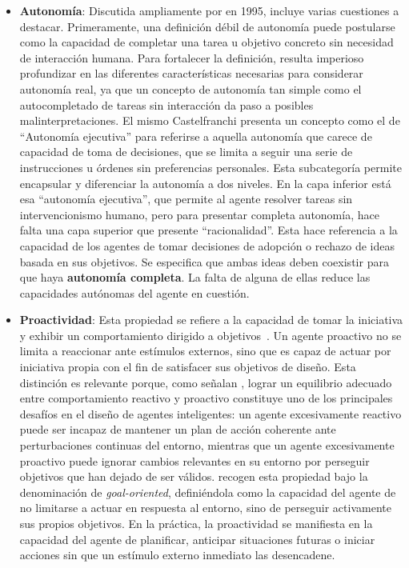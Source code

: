 \begin{itemize}
\begin{itemize}
\item \textbf{Autonomía}:
Discutida ampliamente por \textcite{castelfranchi1995guarantees} en 1995, incluye varias cuestiones a destacar. Primeramente, una definición débil de autonomía puede postularse como la capacidad de completar una tarea u objetivo concreto sin necesidad de interacción humana\cite{castelfranchi1995guarantees}. Para fortalecer la definición, resulta imperioso profundizar en las diferentes características necesarias para considerar autonomía real, ya que un concepto de autonomía tan simple como el autocompletado de tareas sin interacción da paso a posibles malinterpretaciones. El mismo Castelfranchi presenta un concepto como el de \enquote{Autonomía ejecutiva} para referirse a aquella autonomía que carece de capacidad de toma de decisiones, que se limita a seguir una serie de instrucciones u órdenes sin preferencias personales. Esta subcategoría permite encapsular y diferenciar la autonomía a dos niveles. En la capa inferior está esa \enquote{autonomía ejecutiva}, que permite al agente resolver tareas sin intervencionismo humano, pero para presentar completa autonomía, hace falta una capa superior que presente \enquote{racionalidad}. Esta hace referencia a la capacidad de los agentes de tomar decisiones de adopción o rechazo de ideas basada en sus objetivos. Se especifica que ambas ideas deben coexistir para que haya \textbf{autonomía completa}. La falta de alguna de ellas reduce las capacidades autónomas del agente en cuestión.

\item \textbf{Proactividad}:
Esta propiedad se refiere a la capacidad de tomar la iniciativa y exhibir un comportamiento dirigido a objetivos~\cite[p.~116]{Wooldridge1995}. Un agente proactivo no se limita a reaccionar ante estímulos externos, sino que es capaz de actuar por iniciativa propia con el fin de satisfacer sus objetivos de diseño. Esta distinción es relevante porque, como señalan \textcite{Wooldridge1995}, lograr un equilibrio adecuado entre comportamiento reactivo y proactivo constituye uno de los principales desafíos en el diseño de agentes inteligentes: un agente excesivamente reactivo puede ser incapaz de mantener un plan de acción coherente ante perturbaciones continuas del entorno, mientras que un agente excesivamente proactivo puede ignorar cambios relevantes en su entorno por perseguir objetivos que han dejado de ser válidos. \textcite{franklin1996agent} recogen esta propiedad bajo la denominación de \textit{goal-oriented}, definiéndola como la capacidad del agente de no limitarse a actuar en respuesta al entorno, sino de perseguir activamente sus propios objetivos. En la práctica, la proactividad se manifiesta en la capacidad del agente de planificar, anticipar situaciones futuras o iniciar acciones sin que un estímulo externo inmediato las desencadene.



\end{itemize}
\end{itemize}
